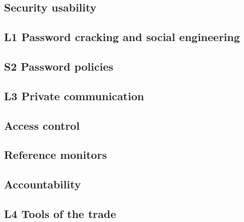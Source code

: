 \subsection{Security usability}


\subsection{L1 Password cracking and social engineering}


\subsection{S2 Password policies}


\subsection{L3 Private communication}


\subsection{Access control}


\subsection{Reference monitors}


%

%

\subsection{Accountability}


\subsection{L4 Tools of the trade}


